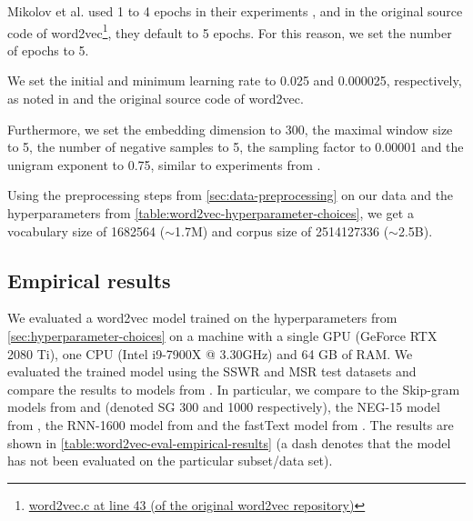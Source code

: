Mikolov et al. used 1 to 4 epochs in their experiments \cite{mikolov2013a, mikolov2013b}, and in the original source code of word2vec\footnote{\href{https://github.com/tmikolov/word2vec/blob/e092540633572b883e25b367938b0cca2cf3c0e7/word2vec.c/\#L43}{word2vec.c at line 43 (of the original word2vec repository)}}, they default to 5 epochs. For this reason, we set the number of epochs to 5.

We set the initial and minimum learning rate to 0.025 and 0.000025, respectively, as noted in \cite{mikolov2013a} and the original source code of word2vec.

Furthermore, we set the embedding dimension to 300, the maximal window size to 5, the number of negative samples to 5, the sampling factor to 0.00001 and the unigram exponent to 0.75, similar to experiments from \cite{mikolov2013b}.

Using the preprocessing steps from \cref{sec:data-preprocessing} on our data and the hyperparameters from \cref{table:word2vec-hyperparameter-choices}, we get a vocabulary size of 1682564 ($\sim$1.7M) and corpus size of 2514127336 ($\sim$2.5B).

\subsection{Empirical results}
We evaluated a word2vec model trained on the hyperparameters from \cref{sec:hyperparameter-choices} on a machine with a single GPU (GeForce RTX 2080 Ti), one CPU (Intel i9-7900X @ 3.30GHz) and 64 GB of RAM. We evaluated the trained model using the SSWR and MSR test datasets and compare the results to models from \cite{mikolov2013a, mikolov2013b, mikolov-etal-2013-linguistic, bojanowski2017enriching}. In particular, we compare to the Skip-gram models from \cite[Table 3]{mikolov2013a} and \cite[Table 6]{mikolov2013a} (denoted SG 300 and 1000 respectively), the NEG-15 model from \cite[Table 1]{mikolov2013b}, the RNN-1600 model from \cite[Table 2]{mikolov-etal-2013-linguistic} and the fastText model from \cite[Table 2]{bojanowski2017enriching}. The results are shown in \cref{table:word2vec-eval-empirical-results} (a dash denotes that the model has not been evaluated on the particular subset/data set).


